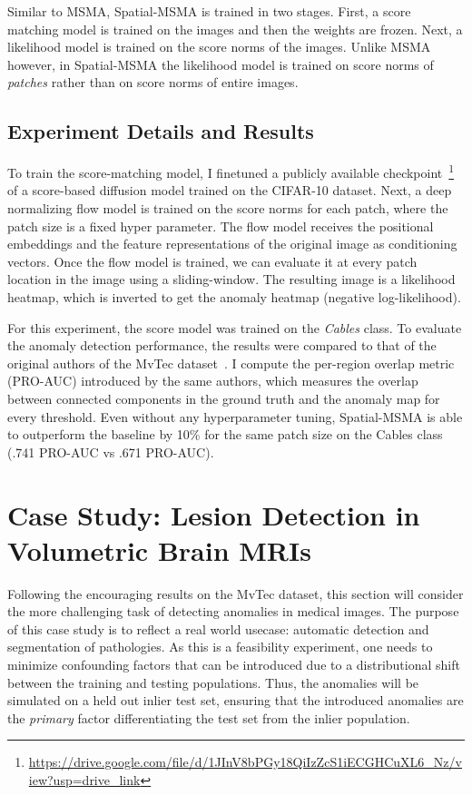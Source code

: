 Similar to MSMA, Spatial-MSMA is trained in two stages. First, a score matching model is trained on the images and then the weights are frozen. Next, a likelihood model is trained on the score norms of the images. Unlike MSMA however, in Spatial-MSMA the likelihood model is trained on score norms of \textit{patches} rather than on score norms of entire images.

\subsection*{Experiment Details and Results}
To train the score-matching model, I finetuned a publicly available checkpoint~\footnote{\url{https://drive.google.com/file/d/1JInV8bPGy18QiIzZcS1iECGHCuXL6_Nz/view?usp=drive_link}} of a score-based diffusion model trained on the CIFAR-10 dataset. Next, a deep normalizing flow model is trained on the score norms for each patch, where the patch size is a fixed hyper parameter. The flow model receives the positional embeddings and the feature representations of the original image as conditioning vectors. Once the flow model is trained, we can evaluate it at every patch location in the image using a sliding-window. The resulting image is a likelihood heatmap, which is inverted to get the anomaly heatmap (negative log-likelihood).

For this experiment, the score model was trained on the \textit{Cables} class. To evaluate the anomaly detection performance, the results were compared to that of the original authors of the MvTec dataset~\cite{bergmann2020uninformed}. I compute the per-region overlap metric (PRO-AUC) introduced by the same authors, which measures the overlap between connected components in the ground truth and the anomaly map for every threshold. Even without any hyperparameter tuning, Spatial-MSMA is able to outperform the baseline by 10\% for the same patch size on the Cables class (.741 PRO-AUC vs .671 PRO-AUC).


\section{Case Study: Lesion Detection in Volumetric Brain MRIs}
Following the encouraging results on the MvTec dataset, this section will consider the more challenging task of detecting anomalies in medical images. The purpose of this case study is to reflect a real world usecase: automatic detection and segmentation of pathologies. As this is a feasibility experiment, one needs to minimize confounding factors that can be introduced due to a distributional shift between the training and testing populations. Thus, the anomalies will be simulated on a held out inlier test set, ensuring that the introduced anomalies are the \textit{primary} factor differentiating the test set from the inlier population.

